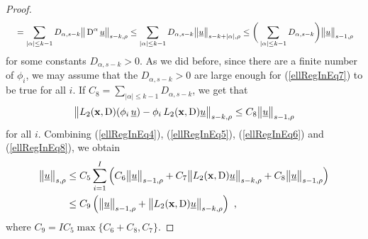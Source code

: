 \begin{proof}
\begin{align}
&\quad = \sum_{|\alpha|\leq k-1} D_{\alpha,s-k}
\big\|\operatorname{D}^\alpha \underline{u} \big\|_{s-k,\rho}
\leq \sum_{|\alpha|\leq k-1} D_{\alpha,s-k}
\big\| \underline{u} \big\|_{s-k+|\alpha|,\rho}
\leq \bigg( \sum_{|\alpha|\leq k-1} D_{\alpha,s-k} \bigg)
\big\| \underline{u} \big\|_{s-1,\rho} \label{ellRegInEq7}
\end{align}
for some constants $D_{\alpha,s-k}>0$.
As we did before, since there are a finite number of $\phi_i$, we may
assume that the $D_{\alpha,s-k}>0$ are large
enough for (\ref{ellRegInEq7}) to be true for all $i$.
If $\displaystyle C_8 = \sum_{|\alpha|\leq k-1} D_{\alpha,s-k}$,
we get that
\begin{equation} \label{ellRegInEq8}
\big\|L_2(\mathbf{x},\operatorname{D})(\phi_i\,\underline{u})
- \phi_i\, L_2(\mathbf{x},\operatorname{D})\underline{u} \big\|_{s-k,\rho}
\leq C_8 \big\| \underline{u} \big\|_{s-1,\rho}
\end{equation}
for all $i$.  Combining (\ref{ellRegInEq4}), (\ref{ellRegInEq5}),
(\ref{ellRegInEq6}) and (\ref{ellRegInEq8}), we obtain
\begin{align}
\big\|\underline{u}\big\|_{s,\rho}
&\leq C_5 \sum_{i=1}^I  
\left( C_6 \big\|\underline{u}\big\|_{s-1,\rho} 
+ C_7 \big\|L_2(\mathbf{x},\operatorname{D})\underline{u}\big\|_{s-k,\rho}
+ C_8 \big\| \underline{u} \big\|_{s-1,\rho} \right) \nonumber \\
&\leq C_9 \left( \big\|\underline{u}\big\|_{s-1,\rho}
+ \big\|L_2(\mathbf{x},\operatorname{D})\underline{u}\big\|_{s-k,\rho} \right) \ ,
\label{ellRegInEq9}
\end{align}
where $C_9 = I C_5 \max\{ C_6 + C_8, C_7\}$.


\end{proof}
